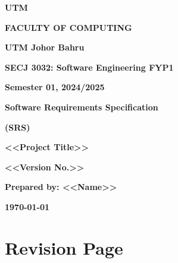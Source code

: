 \documentclass[oneside]{utmsrs}
\begin{document}
\begin{titlepage}
    \begin{center}
        \vspace*{1cm}
        
        \textbf{\Large UTM}
        
        \vspace{0.5cm}
        
        \textbf{\large FACULTY OF COMPUTING}
        
        \vspace{0.5cm}
        
        \textbf{\large UTM Johor Bahru}
        
        \vspace{1cm}
        
        \textbf{\large SECJ 3032: Software Engineering FYP1}
        
        \vspace{0.5cm}
        
        \textbf{\large Semester 01, 2024/2025}
        
        \vspace{1.5cm}
        
        \textbf{\Huge Software Requirements Specification}
        
        \vspace{0.5cm}
        
        \textbf{\Large (SRS)}
        
        \vspace{2cm}
        
        \textbf{\LARGE <<Project Title>>}
        
        \vspace{1cm}
        
        \textbf{\large <<Version No.>>}
        
        \vspace{2cm}
        
        \textbf{\large Prepared by: <<Name>>}
        
        \vspace*{\fill}
        
        \textbf{\large \today}
    \end{center}
\end{titlepage}

\frontmatter

\chapter*{Revision Page}
\end{document}
